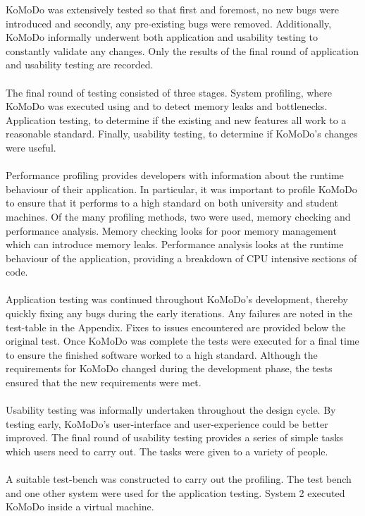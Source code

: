 KoMoDo was extensively tested so that first and foremost, no new bugs were introduced and secondly, any pre-existing bugs were removed. Additionally, KoMoDo informally underwent both application and usability testing to constantly validate any changes. Only the results of the final round of application and usability testing are recorded.\\\\
%
The final round of testing consisted of three stages. System profiling, where KoMoDo was executed using  and  to detect memory leaks and bottlenecks. Application testing, to determine if the existing and new features all work to a reasonable standard. Finally, usability testing, to determine if KoMoDo's changes were useful.\\\\
%
Performance profiling provides developers with information about the runtime behaviour of their application. In particular, it was important to profile KoMoDo to ensure that it performs to a high standard on both university and student machines. Of the many profiling methods, two were used, memory checking and performance analysis. Memory checking looks for poor memory management which can introduce memory leaks. Performance analysis looks at the runtime behaviour of the application, providing a breakdown of CPU intensive sections of code.\\\\
%
Application testing was continued throughout KoMoDo's development, thereby quickly fixing any bugs during the early iterations. Any failures are noted in the test-table in the Appendix. Fixes to issues encountered are provided below the original test. Once KoMoDo was complete the tests were executed for a final time to ensure the finished software worked to a high standard. Although the requirements for KoMoDo changed during the development phase, the tests ensured that the new requirements were met.\\\\
%
Usability testing was informally undertaken throughout the design cycle. By testing early, KoMoDo's user-interface and user-experience could be better improved. The final round of usability testing provides a series of simple tasks which users need to carry out. The tasks were given to a variety of people.\\\\
%
A suitable test-bench was constructed to carry out the profiling. The test bench and one other system were used for the application testing. System 2 executed KoMoDo inside a virtual machine.\\\\
